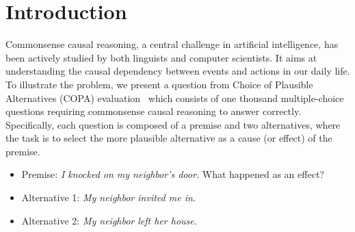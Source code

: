 \section{Introduction}
\label{sec:intro}
Commonsense causal reasoning, a central challenge in artificial intelligence,
has been actively studied by both linguists and computer scientists.
It aims at understanding the causal dependency
between events and actions in our daily life.
To illustrate the problem,
we present a question from
Choice of Plausible Alternatives (COPA) evaluation~\cite{roemmele2011choice}
which consists of one thousand multiple-choice questions requiring
commonsense causal reasoning to answer correctly.
Specifically, each question is composed of a premise and two
alternatives, where the task is to select the more plausible alternative as
a cause (or effect) of the premise.


\begin{example}
\label{ex:copa}
\noindent
\begin{itemize}
\item[] Premise: \emph{I knocked on my neighbor's door.} What happened as an
effect?
\item[] Alternative 1: \emph{My neighbor invited me in.}
\item[] Alternative 2: \emph{My neighbor left her house.}
\end{itemize}
\end{example}

